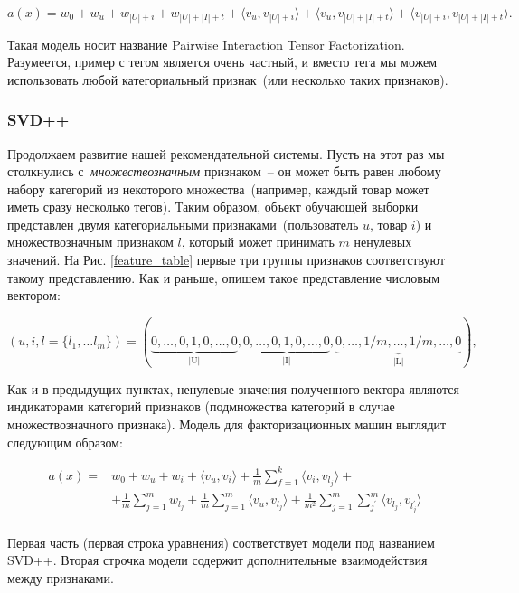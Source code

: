 \documentclass[12pt,a4paper]{article}
\begin{document}
\begin{equation}
	a(x) = w_0 + w_u + w_{|U|+i} + w_{|U|+|I|+t} + \langle v_u, v_{|U|+i}\rangle + \langle v_u, v_{|U|+|I|+t}\rangle + \langle v_{|U|+i}, v_{|U|+|I|+t}\rangle.
\end{equation}

Такая модель носит название Pairwise Interaction Tensor Factorization. Разумеется, пример с тегом является очень частный, и вместо тега мы можем использовать любой категориальный признак~(или несколько таких признаков).

\subsubsection{SVD++}

Продолжаем развитие нашей рекомендательной системы. Пусть на этот раз мы столкнулись с~\textit{множествозначным} признаком~-- он может быть равен любому набору категорий из некоторого множества~(например, каждый товар может иметь сразу несколько тегов). Таким образом, объект обучающей выборки представлен двумя категориальными признаками~(пользователь $u$, товар $i$) и множествозначным признаком $l$, который может принимать $m$ ненулевых значений. На Рис. \ref{feature_table} первые три группы признаков соответствуют такому представлению. Как и раньше, опишем такое представление числовым вектором:

\[
  (u,i,l = \{l_1, \ldots l_m \}) = (\underbrace{0,\ldots, 0, 1, 0, \ldots, 0}_\text{|U|}, \underbrace{0,\ldots, 0, 1, 0, \ldots, 0}_\text{|I|},\underbrace{0,\ldots, 1/m, \ldots, 1/m,\ldots, 0}_\text{|L|}),
\] 

Как и в предыдущих пунктах, ненулевые значения полученного вектора являются индикаторами категорий признаков (подмножества категорий в случае множествозначного признака). Модель для факторизационных машин выглядит следующим образом:

\begin{align*}
	a(x) = & w_0 + w_u + w_i + \langle v_{u},  v_{i} \rangle + \frac{1}{m}\sum_{f=1}^k \langle v_{i},  v_{l_{j}} \rangle + \\
	& + \frac{1}{m}\sum_{j=1}^m w_{l_j} + \frac{1}{m}\sum_{j=1}^m \langle v_u, v_{l_j} \rangle + \frac{1}{m^2}\sum_{j=1}^m\sum_{j^\prime}^m \langle v_{l_j}, v_{l_j^{\prime}} \rangle\\
\end{align*}

Первая часть (первая строка уравнения) соответствует модели под названием SVD++. Вторая строчка модели содержит дополнительные взаимодействия между признаками.
\end{document}
